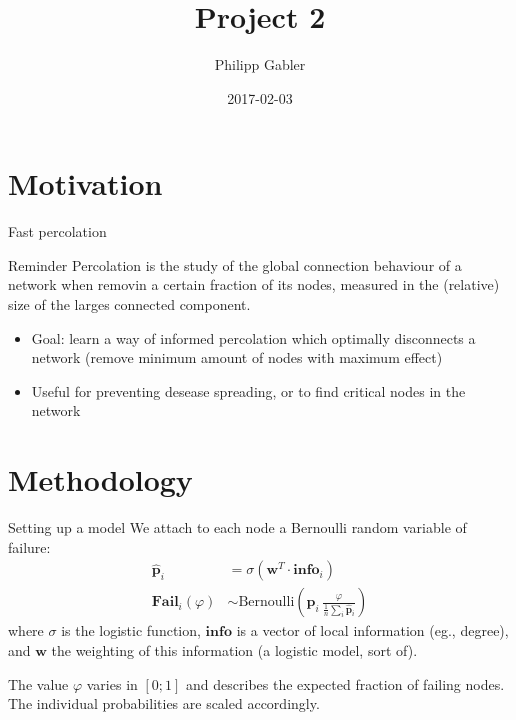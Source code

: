 \documentclass{beamer}
\author{Philipp Gabler}
\title{Project 2}
\date{2017-02-03}
\begin{document}
\beamertemplatenavigationsymbolsempty

\section{Motivation}
\begin{frame}{Fast percolation}
  \begin{block}{Reminder}
    Percolation is the study of the global connection behaviour of a network when removin a certain
    fraction of its nodes, measured in the (relative) size of the larges connected component.
  \end{block}
  
  \begin{itemize}
  \item Goal: learn a way of informed percolation which optimally disconnects a network (remove
    minimum amount of nodes with maximum effect)
  \item Useful for preventing desease spreading, or to find critical nodes in the network
  \end{itemize}
\end{frame}


\section{Methodology}
\begin{frame}{Setting up a model}
We attach to each node a Bernoulli random variable of failure:
\begin{align*}
  \hat{\mathbf{p}}_i &= \sigma(\mathbf{w}^T \cdot \mathbf{info}_i) \\
  \mathbf{Fail}_i(\varphi) &\sim \text{Bernoulli}\left(\hat{\mathbf{p}}_i\,
                      \frac{\varphi}{\frac{1}{n}\sum_i \hat{\mathbf{p}}_i}\right)
\end{align*}
where \(\sigma\) is the logistic function, \(\mathbf{info}\) is a vector of local information (eg.,
degree), and \(\mathbf{w}\) the weighting of this information (a logistic model, sort of).

The value \(\varphi\) varies in \([0; 1]\) and describes the expected fraction of failing nodes.  The
individual probabilities are scaled accordingly.
\end{frame}



\end{document}
